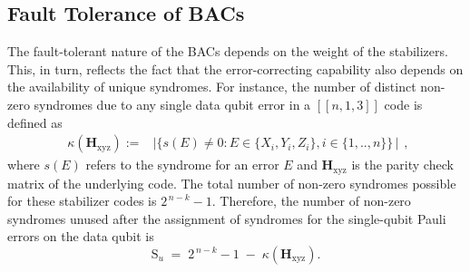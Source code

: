 \documentclass[reprint, amsmath,amssymb, aps,pra,
 floatfix,
]{revtex4-2}
\begin{document}
\subsection{Fault Tolerance of BACs}
\noindent The fault-tolerant nature of the BACs depends on the weight of the stabilizers.
This, in turn, reflects the fact that the error-correcting capability also depends on the availability of unique syndromes. 
For instance, the number of distinct non-zero syndromes due to any single data qubit error in a $[[n,1,3]]$ code is defined as 
\begin{equation*}
\begin{split}
\kappa(\mathbf{H}_{\mathrm{xyz}}) := & \big|\{ s(E)\neq 0: E\in\{X_i,Y_i,Z_i\},  i \in \{1,.., n\} \} \, \big|
\end{split},
\end{equation*}
where $s(E)$ refers to the syndrome for an error $E$ and $\mathbf{H}_{\mathrm{xyz}}$ is the parity check matrix of the underlying code.
The total number of non-zero syndromes possible for these stabilizer codes is $2^{\,n-k}-1$.
Therefore, the number of non-zero syndromes unused after the assignment of syndromes for the single-qubit Pauli errors on the data qubit is
\begin{equation}
 \mathrm{S}_u \;=\; 2^{\,n-k}-1 \;-\; \kappa(\mathbf{H}_{\mathrm{xyz}}).
 \label{eq:unique_syndrome}
\end{equation}
\end{document}
